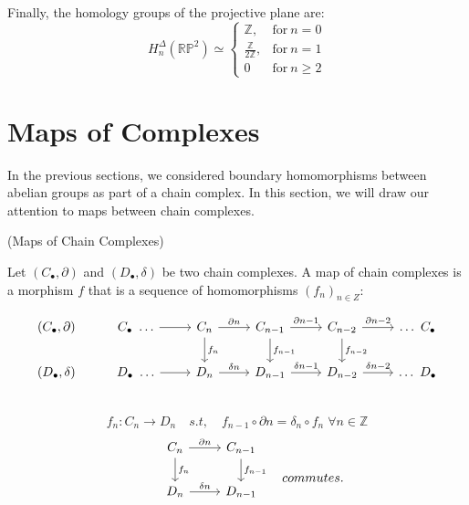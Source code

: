 \documentclass[11pt,a4paper]{report}
\begin{document}
Finally, the homology groups of the projective plane are:
		\[
	  		H_n^\Delta(\mathbb{R} \mathbb{P}^2) \simeq \left\{
			      \begin{array}{rl}
			     \mathbb{Z}, & \textrm{for} \: n = 0\\
			     \frac{\mathbb{Z}}{2\mathbb{Z}}, & \textrm{for} \: n = 1\\
                        0 & \textrm{for} \: n \geqslant 2
			      \end{array}
			 \right.
	  	\]



    \section{Maps of Complexes}
    In the previous sections, we considered boundary homomorphisms between abelian groups as part of a chain complex. In this section, we will draw our attention to maps between chain complexes.

    \begin{defn}(Maps of Chain Complexes)

     Let $(C_\bullet, \partial)$ and $(D_\bullet, \delta)$ be two chain complexes.
     A map of chain complexes is a morphism $f$ that is a sequence of homomorphisms $(f_n)_{n  \in  Z}$:

            \[
                  \begin{tikzcd}[ampersand replacement=\&]
                    (C_\bullet, \partial) \& C_\bullet \ \ldots \arrow[r]  \& C_n \arrow[r, "\partial n"] \arrow[d, "{f_n}"]   \& C_{n-1} \arrow[r, "\partial {n-1}"] \arrow[d, "f_{n-1}"]   \& C_{n-2} \arrow[r, "\partial {n-2}"] \arrow[d, "f_{n-2}"]    \& \ldots \ C_\bullet \\
                    (D_\bullet, \delta) \& D_\bullet \ \ldots \arrow[r]    \& D_n \arrow[r, "\delta n"]    \& D_{n-1} \arrow[r, "\delta {n-1}"]    \& D_{n-2} \arrow[r, "\delta {n-2}"]   \& \ldots \ D_\bullet \\
                  \end{tikzcd}
                \]
            \[
                  f_n : C_n \rightarrow D_n \quad s.t, \quad   f_{n-1} \circ \partial n = \delta_n \circ f_n \; \forall n \in \mathbb{Z}
                  \]
                   \[
                  \begin{tikzcd}[ampersand replacement=\&]
                    \& C_n \arrow[r, "\partial n"] \arrow[d, "{f_n}"]    \& C_{n-1} \arrow[d, "{f_{n-1}}"] \\
                    \& D_n \arrow[r, "\delta n"]    \& D_{n-1} \\
                  \end{tikzcd}
                   \quad         commutes.
                \]


    \end{defn}
\end{document}
